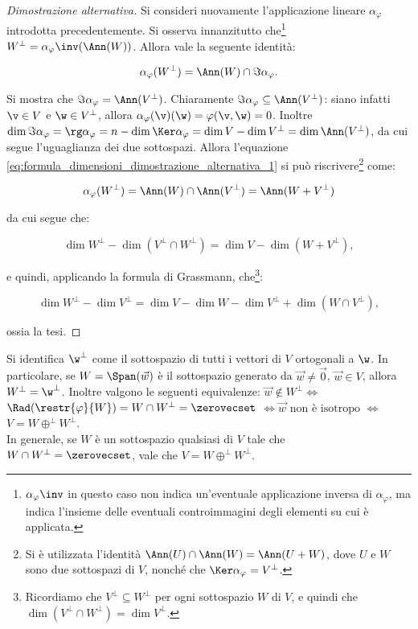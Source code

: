 \begin{proof}[Dimostrazione alternativa]
	Si consideri nuovamente l'applicazione lineare $\alpha_\varphi$ introdotta
	precedentemente. Si osserva innanzitutto che\footnote{$\alpha_\varphi\inv$ in questo caso non indica un'eventuale applicazione inversa di $\alpha_\varphi$, ma indica l'insieme delle eventuali controimmagini degli elementi su cui è applicata.} $W^\perp = \alpha_\varphi\inv(\Ann(W))$. Allora vale la seguente identità:
	
	\begin{equation}
		\label{eq:formula_dimensioni_dimostrazione_alternativa_1}
		\alpha_\varphi(W^\perp) = \Ann(W) \cap \Im \alpha_\varphi.
	\end{equation}

	\vskip 0.05in
	
	Si mostra che $\Im \alpha_\varphi = \Ann(V^\perp)$. Chiaramente $\Im \alpha_\varphi \subseteq \Ann(V^\perp)$: siano infatti $\v \in V$ e $\w \in V^\perp$, allora $\alpha_\varphi(\v)(\w) = \varphi(\v, \w) = 0$. Inoltre $\dim \Im \alpha_\varphi = \rg \alpha_\varphi = n - \dim \Ker \alpha_\varphi = \dim V - \dim V^\perp = \dim \Ann(V^\perp)$,
	da cui segue l'uguaglianza dei due sottospazi. Allora l'equazione \eqref{eq:formula_dimensioni_dimostrazione_alternativa_1} si può riscrivere\footnote{Si è utilizzata l'identità $\Ann(U) \cap \Ann(W) = \Ann(U + W)$, dove $U$ e $W$ sono due sottospazi di $V$, nonché che $\Ker \alpha_\varphi = V^\perp$.} come:
	
	\[ \alpha_\varphi(W^\perp) = \Ann(W) \cap \Ann(V^\perp) = \Ann(W + V^\perp) \]
	
	da cui segue che:
	
	\[ \dim W^\perp - \dim (V^\perp \cap W^\perp) = \dim V - \dim (W + V^\perp), \]
	
	e quindi, applicando la formula di Grassmann, che\footnote{Ricordiamo che $V^\perp \subseteq W^\perp$ per ogni sottospazio $W$ di $V$, e quindi che $\dim (V^\perp \cap W^\perp) = \dim V^\perp$.}:
	
	\[ \dim W^\perp - \dim V^\perp = \dim V - \dim W - \dim V^\perp + \dim (W \cap V^\perp), \]
	
	ossia la tesi.
\end{proof}

\begin{remark} Si identifica $\w^\perp$ come il sottospazio di tutti i vettori di $V$ ortogonali a $\w$.
	In particolare, se $W = \Span(\vec w)$ è il sottospazio generato da $\vec w \neq \vec 0$, $\vec w \in V$, allora $W^\perp = \w^\perp$. Inoltre valgono le seguenti equivalenze: $\vec w \notin W^\perp \iff$ $\Rad (\restr{\varphi}{W}) = W \cap W^\perp = \zerovecset$ $\iff \vec w \text{ non è isotropo } \iff$ $V = W \oplus^\perp W^\perp$. \\
	
	In generale, se $W$ è un sottospazio qualsiasi di $V$ tale che $W \cap W^\perp = \zerovecset$, vale
	che $V = W \oplus^\perp W^\perp$.
\end{remark}

